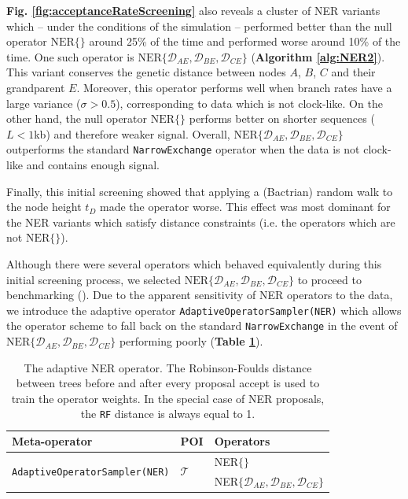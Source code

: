 \documentclass[10pt,letterpaper]{article}
\begin{document}
\textbf{Fig. \ref{fig:acceptanceRateScreening}} also reveals a cluster of NER variants which -- under the conditions of the simulation --  performed better than the null operator $\text{NER}\{\}$ around 25\% of the time and performed worse around 10\% of the time. 
One such operator is  $\text{NER}\{\mathcal{D}_{AE}, \mathcal{D}_{BE}, \mathcal{D}_{CE}\}$  (\textbf{Algorithm \ref{alg:NER2}}). 
This variant conserves the genetic distance between nodes $A$, $B$, $C$ and their grandparent $E$. 
Moreover, this operator performs well when branch rates have a large variance ($\sigma > 0.5$), corresponding to data which is not clock-like. 
On the other hand, the null operator $\text{NER}\{\}$ performs better on shorter sequences ($L < 1$kb) and therefore weaker signal.  
Overall, $\text{NER}\{\mathcal{D}_{AE}, \mathcal{D}_{BE}, \mathcal{D}_{CE}\}$ outperforms the standard \texttt{NarrowExchange} operator when the data is not clock-like and contains enough signal. 



Finally, this initial screening showed that applying a (Bactrian) random walk to the node height $t_D$ made the operator worse.
This effect was most dominant for the NER variants which satisfy distance constraints (i.e. the operators which are not $\text{NER}\{\}$).




Although there were several operators which behaved equivalently during this initial screening process, we selected $\text{NER}\{\mathcal{D}_{AE}, \mathcal{D}_{BE}, \mathcal{D}_{CE}\}$ to proceed to benchmarking (\textbf{}).
Due to the apparent sensitivity of NER operators to the data, we introduce the adaptive operator \texttt{AdaptiveOperatorSampler(NER)} which allows the operator scheme to fall back on the standard \texttt{NarrowExchange} in the event of $\text{NER}\{\mathcal{D}_{AE}, \mathcal{D}_{BE}, \mathcal{D}_{CE}\}$ performing poorly (\textbf{Table \ref{table:adaptiveNER}}).





\begin{table}[h!]
\centering
\begin{tabular}{l l l} 
 Meta-operator & POI & Operators \\
\hline
 \multirow{2}{*}{\texttt{AdaptiveOperatorSampler(NER)}} & \multirow{2}{*}{$\mathcal{T}$} & NER$\{  \}$ \\ 
 && NER$\{ \mathcal{D}_{AE}, \mathcal{D}_{BE}, \mathcal{D}_{CE} \}$ \\
\end{tabular}
\caption{The adaptive NER operator. 
The Robinson-Foulds distance between trees before and after every proposal accept is used to train the operator weights. In the special case of NER proposals, the \texttt{RF} distance is always equal to 1. }
\label{table:adaptiveNER}
\end{table}
\end{document}

